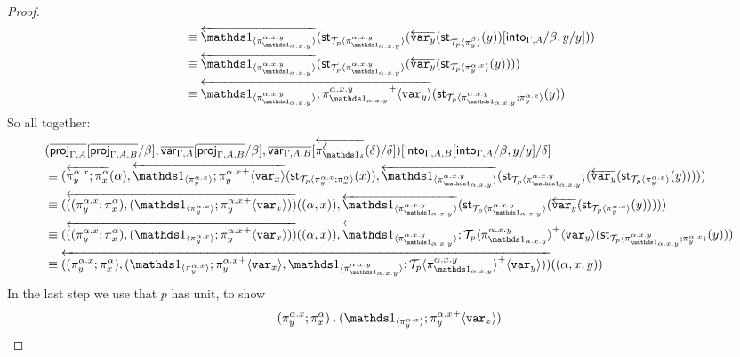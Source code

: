 \documentclass[10pt]{article}
\theoremstyle{definition}
\newcommand{\rewrite}[2]{\overleftarrow{#1}(#2)}
\newcommand\StI[2]{\ensuremath{\mathsf{st}_{#1}(#2)}}
\newcommand\ApEl[2]{\mathcal{T}_{#1}\langle#2\rangle}
\newcommand\bdot[0]{\mathbin{.}}
\newcommand\ApPlus[2]{\ensuremath{{#1}^+ \langle #2 \rangle }}
\begin{document}
\begin{proof}
\begin{align*}
&\equiv \rewrite{\ApOne{\pi^{\alpha.x.y}_{\One_{\alpha.x.y}}}}{\StI{\ApEl{p}{\pi^{\alpha.x.y}_{\One_{\alpha.x.y}}}}{\rewrite{\var{y}}{\StI{\ApEl{p}{\pi^{\beta}_y}}{y}}[\into{\Gamma, A}/\beta, y/y]}} \\
&\equiv \rewrite{\ApOne{\pi^{\alpha.x.y}_{\One_{\alpha.x.y}}}}{\StI{\ApEl{p}{\pi^{\alpha.x.y}_{\One_{\alpha.x.y}}}}{\rewrite{\var{y}}{\StI{\ApEl{p}{\pi^{\alpha.x}_y}}{y}}}} \\
&\equiv \rewrite{\ApOne{\pi^{\alpha.x.y}_{\One_{\alpha.x.y}}};\ApPlus{\pi^{\alpha.x.y}_{\One_{\alpha.x.y}}}{\var{y}}}{\StI{\ApEl{p}{\pi^{\alpha.x.y}_{\One_{\alpha.x.y}};\pi^{\alpha.x}_y}}{y}}
\end{align*}
So all together:
\begin{align*}
&(\upstairs{\proj{\Gamma, A}}[\upstairs{\proj{\Gamma, A, B}}/\beta], \upstairs{\qvar{\Gamma, A}}[\upstairs{\proj{\Gamma, A, B}}/\beta], \upstairs{\qvar{\Gamma, A, B}}[\rewrite{\pi^\delta_{\One_\delta}}{\delta}/\delta])[\into{\Gamma, A, B}[\into{\Gamma, A}/\beta, y/y]/\delta] \\
&\equiv (\rewrite{\pi^{\alpha.x}_y;\pi^\alpha_x}{\alpha}, \rewrite{\ApOne{\pi^{\alpha.x}_y};\ApPlus{\pi^{\alpha.x}_y}{\var{x}}}{\StI{\ApEl{p}{\pi^{\alpha.x}_y;\pi^{\alpha}_x}}{x}}, \rewrite{\ApOne{\pi^{\alpha.x.y}_{\One_{\alpha.x.y}}}}{\StI{\ApEl{p}{\pi^{\alpha.x.y}_{\One_{\alpha.x.y}}}}{\rewrite{\var{y}}{\StI{\ApEl{p}{\pi^{\alpha.x}_y}}{y}}}}) \\
&\equiv (\rewrite{((\pi^{\alpha.x}_y;\pi^\alpha_x), (\ApOne{\pi^{\alpha.x}_y};\ApPlus{\pi^{\alpha.x}_y}{\var{x}}))}{(\alpha, x)}, \rewrite{\ApOne{\pi^{\alpha.x.y}_{\One_{\alpha.x.y}}}}{\StI{\ApEl{p}{\pi^{\alpha.x.y}_{\One_{\alpha.x.y}}}}{\rewrite{\var{y}}{\StI{\ApEl{p}{\pi^{\alpha.x}_y}}{y}}}}) \\
&\equiv (\rewrite{((\pi^{\alpha.x}_y;\pi^\alpha_x), (\ApOne{\pi^{\alpha.x}_y};\ApPlus{\pi^{\alpha.x}_y}{\var{x}}))}{(\alpha, x)}, \rewrite{\ApOne{\pi^{\alpha.x.y}_{\One_{\alpha.x.y}}};\ApPlus{\ApEl{p}{\pi^{\alpha.x.y}_{\One_{\alpha.x.y}}}}{\var{y}}}{\StI{\ApEl{p}{\pi^{\alpha.x.y}_{\One_{\alpha.x.y}};\pi^{\alpha.x}_y}}{y}}) \\
&\equiv \rewrite{((\pi^{\alpha.x}_y;\pi^\alpha_x), (\ApOne{\pi^{\alpha.x}_y};\ApPlus{\pi^{\alpha.x}_y}{\var{x}}, \ApOne{\pi^{\alpha.x.y}_{\One_{\alpha.x.y}}};\ApPlus{\ApEl{p}{\pi^{\alpha.x.y}_{\One_{\alpha.x.y}}}}{\var{y}}))}{(\alpha, x,y)}
\end{align*}
In the last step we use that $p$ has unit, to show
\begin{align*}
&(\pi^{\alpha.x}_y;\pi^\alpha_x) \bdot (\ApOne{\pi^{\alpha.x}_y};\ApPlus{\pi^{\alpha.x}_y}{\var{x}}) \\

\end{align*}
\end{proof}
\end{document}
